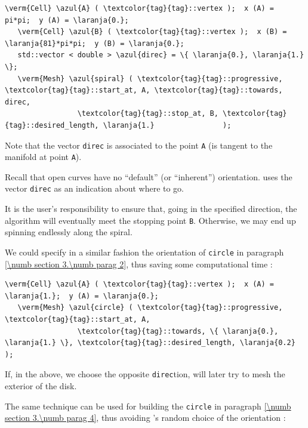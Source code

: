 \begin{Verbatim}[commandchars=\\\{\},formatcom=\small\tt,
   baselinestretch=0.94,framesep=2mm                     ]
   \verm{Cell} \azul{A} ( \textcolor{tag}{tag}::vertex );  x (A) =    pi*pi;  y (A) = \laranja{0.};
   \verm{Cell} \azul{B} ( \textcolor{tag}{tag}::vertex );  x (B) = \laranja{81}*pi*pi;  y (B) = \laranja{0.};
   std::vector < double > \azul{direc} = \{ \laranja{0.}, \laranja{1.} \};
   \verm{Mesh} \azul{spiral} ( \textcolor{tag}{tag}::progressive, \textcolor{tag}{tag}::start_at, A, \textcolor{tag}{tag}::towards, direc,
                 \textcolor{tag}{tag}::stop_at, B, \textcolor{tag}{tag}::desired_length, \laranja{1.}                );
\end{Verbatim}

Note that the vector {\small\tt direc} is associated to the point {\small\tt A}
(is tangent to the manifold at point {\small\tt A}).

Recall that open curves have no ``default'' (or ``inherent'') orientation.
{\ManiFEM} uses the vector {\small\tt direc} as an indication about where to go.

It is the user's responsibility to ensure that, going in the specified direction,
the algorithm will eventually meet the stopping point {\small\tt B}.
Otherwise, we may end up spinning endlessly along the spiral.

We could specify in a similar fashion the orientation of {\small\tt circle} in paragraph
\ref{\numb section 3.\numb parag 2}, thus saving some computational time :

\begin{Verbatim}[commandchars=\\\{\},formatcom=\small\tt,
   baselinestretch=0.94,framesep=2mm                     ]
   \verm{Cell} \azul{A} ( \textcolor{tag}{tag}::vertex );  x (A) = \laranja{1.};  y (A) = \laranja{0.};
   \verm{Mesh} \azul{circle} ( \textcolor{tag}{tag}::progressive, \textcolor{tag}{tag}::start_at, A,
                 \textcolor{tag}{tag}::towards, \{ \laranja{0.}, \laranja{1.} \}, \textcolor{tag}{tag}::desired_length, \laranja{0.2} );
\end{Verbatim}

If, in the above, we choose the opposite {\small\tt direc}tion,
{\maniFEM} will later try to mesh the exterior of the disk.

The same technique can be used for building the {\small\tt circle} in paragraph
\ref{\numb section 3.\numb parag 4}, thus avoiding \maniFEM's random choice of the orientation :

